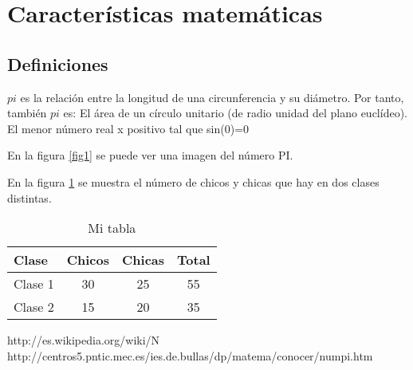 \documentclass[a4paper,12pt]{article}
\begin{document}
\section{Características matemáticas}
\subsection{Definiciones}
$pi$ es la relación entre la longitud de una
circunferencia y su diámetro.
Por tanto, también $pi$ es:
El área de un círculo unitario
(de radio unidad del plano euclídeo).
El menor número real x positivo tal que
sin(0)=0


En la figura \ref{fig1} se puede ver una
imagen del número PI.

En la figura \ref{table1} se muestra el
número de chicos y chicas que hay en dos
clases distintas.
\begin{table}[h]
\begin{center}
\begin{tabular}{|l|c|c|c|}
\hline
Clase & Chicos & Chicas & Total \\ \hline
Clase 1 & 30 & 25 & 55 \\ \hline
Clase 2 & 15 & 20 & 35 \\ \hline 
\end{tabular}
\caption{Mi tabla}
\label{table1}
\end{center}
\end{table}

\begin{thebibliography}{00}
http://es.wikipedia.org/wiki/N%
http://centros5.pntic.mec.es/ies.de.bullas/dp/matema/conocer/numpi.htm
\end{thebibliography}
\end{document}
